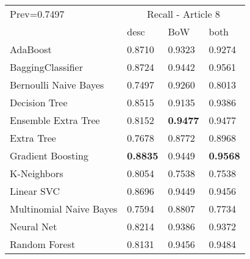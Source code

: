 \begin{tabular}{|l|l|l|l| }
\hline
Prev=0.7497 &  \multicolumn{3}{c|}{Recall - Article 8} \\
\cline{2-4} & desc & BoW & both \\ \hline
AdaBoost                & 0.8710 & 0.9323 & 0.9274\\
BaggingClassifier       & 0.8724 & 0.9442 & 0.9561\\
Bernoulli Naive Bayes   & 0.7497 & 0.9260 & 0.8013\\
Decision Tree           & 0.8515 & 0.9135 & 0.9386\\
Ensemble Extra Tree     & 0.8152 & {\bf 0.9477} & 0.9477\\
Extra Tree              & 0.7678 & 0.8772 & 0.8968\\
Gradient Boosting       & {\bf 0.8835} & 0.9449 & {\bf 0.9568}\\
K-Neighbors             & 0.8054 & 0.7538 & 0.7538\\
Linear SVC              & 0.8696 & 0.9449 & 0.9456\\
Multinomial Naive Bayes & 0.7594 & 0.8807 & 0.7734\\
Neural Net              & 0.8214 & 0.9386 & 0.9372\\
Random Forest           & 0.8131 & 0.9456 & 0.9484\\
\hline
\end{tabular}
